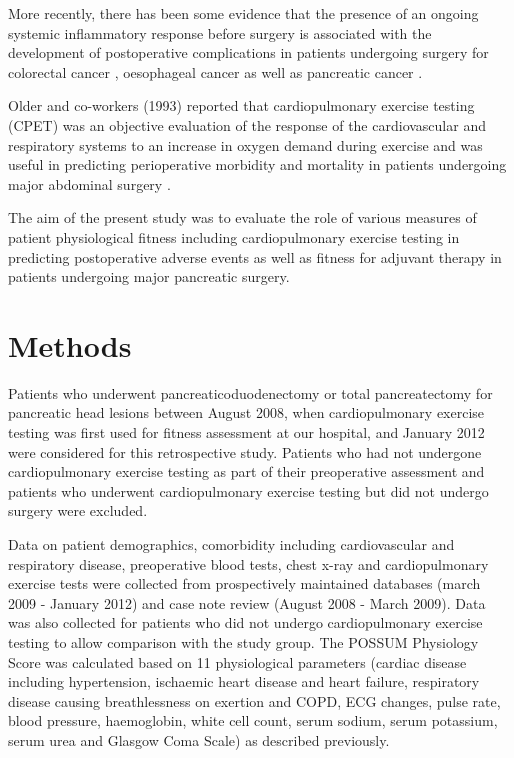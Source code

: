 More recently, there has been some evidence that the presence of an ongoing systemic inflammatory response before surgery is associated with the development of postoperative complications in patients undergoing surgery for colorectal cancer \parencite{moyes_preoperative_2009}, oesophageal cancer \parencite{vashist_glasgow_2010} as well as pancreatic cancer \parencite{knight_evaluation_2010}.

Older and co-workers (1993) reported that cardiopulmonary exercise testing (CPET) was an objective evaluation of the response of the cardiovascular and respiratory systems to an increase in oxygen demand during exercise and was useful in predicting perioperative morbidity and mortality in patients undergoing major abdominal surgery \parencite{older_preoperative_1993}.

The aim of the present study was to evaluate the role of various measures of patient physiological fitness including cardiopulmonary exercise testing in predicting postoperative adverse events as well as fitness for adjuvant therapy in patients undergoing major pancreatic surgery.

\clearpage

\section{Methods}
Patients who underwent pancreaticoduodenectomy or total pancreatectomy for pancreatic head lesions between August 2008, when cardiopulmonary exercise testing was first used for fitness assessment at our hospital, and January 2012 were considered for this retrospective study. Patients who had not undergone cardiopulmonary exercise testing as part of their preoperative assessment and patients who underwent cardiopulmonary exercise testing but did not undergo surgery were excluded. 

Data on patient demographics, comorbidity including cardiovascular and respiratory disease, preoperative blood tests, chest x-ray and cardiopulmonary exercise tests were collected from prospectively maintained databases (march 2009 - January 2012) and case note review (August 2008 - March 2009). Data was also collected for patients who did not undergo cardiopulmonary exercise testing to allow comparison with the study group. The POSSUM Physiology Score was calculated based on 11 physiological parameters (cardiac disease including hypertension, ischaemic heart disease and heart failure, respiratory disease causing breathlessness on exertion and COPD, ECG changes, pulse rate, blood pressure, haemoglobin, white cell count, serum sodium, serum potassium, serum urea and Glasgow Coma Scale) as described previously.

